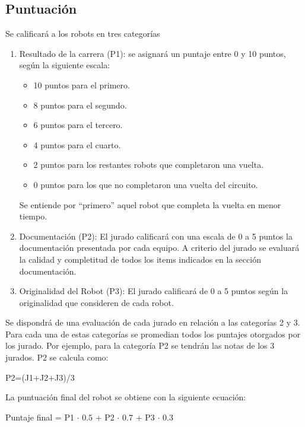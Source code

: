 \documentclass[a4paper,11pt]{article}
\begin{document}
\subsection*{Puntuación}
Se calificará a los robots en tres categorías
\begin{enumerate}
  \item Resultado de la carrera (P1): se asignará un puntaje entre 0 y 10 puntos, según la siguiente escala:
  \begin{itemize}
    \item 10 puntos para el primero.
    \item  8 puntos para el segundo.
    \item  6 puntos para el tercero.
    \item  4 puntos para el cuarto.
    \item  2 puntos para los restantes robots que completaron una vuelta.
    \item  0 puntos para los que no completaron una vuelta del circuito.
  \end{itemize}    
    Se entiende por ``primero'' aquel robot que completa la vuelta en menor tiempo.

  \item Documentación (P2): El jurado calificará con una escala de 0 a 5 puntos la documentación presentada por cada equipo.
  A criterio del jurado se evaluará la calidad y completitud de todos los items indicados en la sección documentación.

  \item Originalidad del Robot (P3): El jurado calificará de 0 a 5 puntos según la originalidad que consideren de cada robot.
\end{enumerate}

Se dispondrá de una evaluación de cada jurado en relación a las categorías 2 y 3. Para cada una de estas categorías se promedian todos los puntajes otorgados por los jurado. Por ejemplo, para la categoría P2 se tendrán las notas de los 3 jurados. P2 se calcula como:

\begin{center}
P2=(J1+J2+J3)/3
\end{center}

La puntuación final del robot se obtiene con la siguiente ecuación:

\begin{center}
Puntaje final = P1 $\cdot$ $0.5$ + P2 $\cdot$ $0.7$ + P3 $\cdot$ $0.3$
\end{center}
\end{document}
